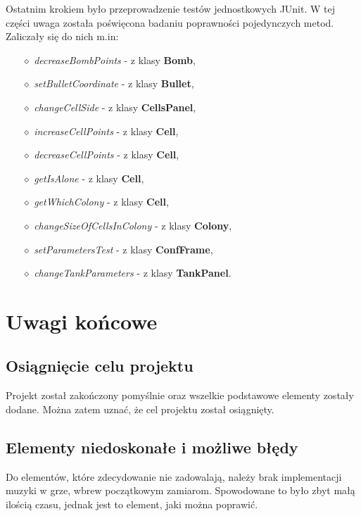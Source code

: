 \documentclass[a4paper]{article}
\begin{document}
Ostatnim krokiem by\l{}o przeprowadzenie test\'ow jednostkowych JUnit. W tej cz\k{e}\'sci uwaga zosta\l{}a po\'swi\k{e}cona badaniu poprawno\'sci pojedynczych metod. Zalicza\l{}y si\k{e} do nich m.in:
\begin{itemize}
    \item[$\diamond$] \textit{decreaseBombPoints} - z klasy \textbf{Bomb},
    \item[$\diamond$] \textit{setBulletCoordinate} - z klasy \textbf{Bullet},
    \item[$\diamond$] \textit{changeCellSide} - z klasy \textbf{CellsPanel},
    \item[$\diamond$] \textit{increaseCellPoints} - z klasy \textbf{Cell},
    \item[$\diamond$] \textit{decreaseCellPoints} - z klasy \textbf{Cell},
    \item[$\diamond$] \textit{getIsAlone} - z klasy \textbf{Cell},
    \item[$\diamond$] \textit{getWhichColony} - z klasy \textbf{Cell},
    \item[$\diamond$] \textit{changeSizeOfCellsInColony} - z klasy \textbf{Colony},
    \item[$\diamond$] \textit{setParametersTest} - z klasy \textbf{ConfFrame},
    \item[$\diamond$] \textit{changeTankParameters} - z klasy \textbf{TankPanel}.
    
\end{itemize}

\section{Uwagi ko\'ncowe}
\subsection{Osi\k{a}gni\k{e}cie celu projektu}
\quad Projekt zosta\l{} zako\'nczony pomy\'slnie oraz wszelkie podstawowe elementy zosta\l{}y dodane. Mo\.zna zatem uzna\'c, \.ze cel projektu zosta\l{} osi\k{a}gni\k{e}ty.
\subsection{Elementy niedoskona\l{}e i mo\.zliwe b\l{}\k{e}dy}
\quad Do element\'ow, kt\'ore zdecydowanie nie zadowalaj\k{a}, nale\.zy brak implementacji muzyki w grze, wbrew pocz\k{a}tkowym zamiarom.
Spowodowane to by\l{}o zbyt ma\l{}\k{a} ilo\'sci\k{a} czasu, jednak jest to element, jaki mo\.zna poprawi\'c.
\end{document}
